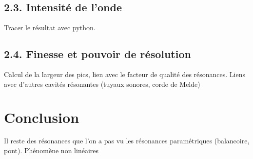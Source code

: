 \documentclass[french, a4paper, 10pt, twocolumn, landscape]{article}
\begin{document}
\subsection*{2.3. Intensité de l'onde}

Tracer le résultat avec python. 

\subsection*{2.4. Finesse et pouvoir de résolution}

Calcul de la largeur des pics, lien avec le facteur de qualité des résonances. 
Liens avec d'autres cavités résonantes (tuyaux sonores, corde de Melde)

\section*{Conclusion}

Il reste des résonances que l'on a pas vu les résonances paramétriques (balancoire, pont).  Phénomène non linéaires
\end{document}
